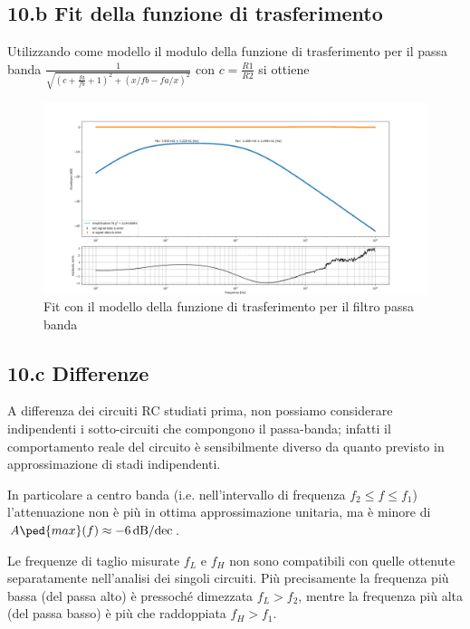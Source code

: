 \documentclass[10pt, a4paper, italian]{article}
\begin{document}
\subsection*{10.b Fit della funzione di trasferimento}
Utilizzando come modello il modulo della funzione di trasferimento per il passa banda $\frac{1}{\sqrt{(c + \frac{fa}{fb} + 1)^2 + (x/fb - fa/x)^2}}$ con $c=\frac{R1}{R2}$ si ottiene

\begin{figure}[htb]
\centering
\includegraphics[scale=0.35]{passa_banda}
\caption{Fit con il modello della funzione di trasferimento per il filtro
passa banda}
\end{figure}

\subsection*{10.c Differenze}
A differenza dei circuiti RC studiati prima, non possiamo considerare
indipendenti i sotto-circuiti che compongono il passa-banda; infatti il
comportamento reale del circuito è sensibilmente diverso da quanto previsto in 
approssimazione di stadi indipendenti.

In particolare a centro banda (i.e. nell'intervallo di frequenza
$f_2 \leq f \leq f_1$) l'attenuazione non è più in ottima approssimazione
unitaria, ma è minore di $A\ped{max}(f) \approx \SI{-6}{\dB/dec}$.

Le frequenze di taglio misurate $f_L$ e $f_H$ non sono compatibili con quelle
ottenute separatamente nell'analisi dei singoli circuiti. Più precisamente
la frequenza più bassa (del passa alto) è pressoché dimezzata
$f_L > f_2$, mentre la frequenza più alta (del passa basso) è più che
raddoppiata $f_H > f_1$.
\end{document}
